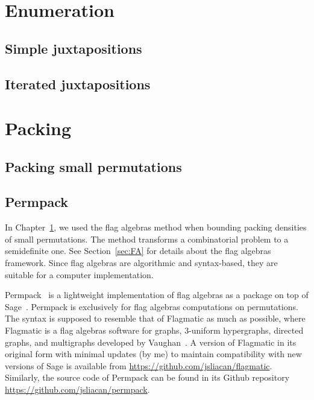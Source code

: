 \documentclass[12pt, a4paper, twoside]{report}
\begin{document}


\part{Enumeration}
\label{part:enumeration}


\chapter{Simple juxtapositions}
\label{chap:catalanjuxt}



\chapter{Iterated juxtapositions}
\label{chap:iterjuxt}


\part{Packing}
\label{part:packing}


\chapter{Packing small permutations}
\label{chap:packsmall}



\chapter{Permpack}
\label{chap:permpack}
%


In Chapter~\ref{chap:packsmall}, we used the flag algebras method when bounding packing densities of small permutations. The method transforms a combinatorial problem to a semidefinite one. See Section~\ref{sec:FA} for details about the flag algebras framework. Since flag algebras are algorithmic and syntax-based, they are suitable for a computer implementation.

Permpack~\cite{permpack} is a lightweight implementation of flag algebras as a package on top of Sage~\cite{sagemath}. Permpack is exclusively for flag algebras computations on permutations. The syntax is supposed to resemble that of Flagmatic as much as possible, where Flagmatic is a flag algebras software for graphs, 3-uniform hypergraphs, directed graphs, and multigraphs developed by Vaughan~\cite{flagmatic}. A version of Flagmatic in its original form with minimal updates (by me) to maintain compatibility with new versions of Sage is available from \url{https://github.com/jsliacan/flagmatic}. Similarly, the source code of Permpack can be found in its Github repository \url{https://github.com/jsliacan/permpack}. 
\end{document}
